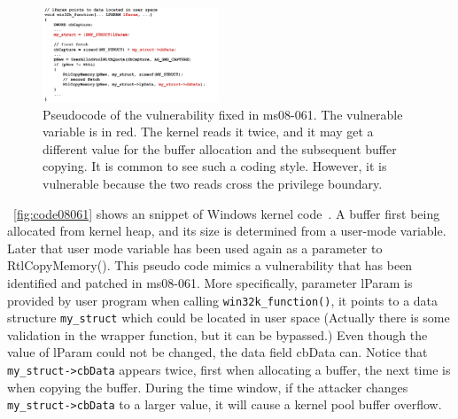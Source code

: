 %
%


\begin{figure}[th]
	\includegraphics[width=0.47\textwidth]{figures/code08061}
	\centering
	\caption{Pseudocode of the vulnerability fixed in ms08-061. The vulnerable variable is in red. The kernel reads it twice, and it may get a different value for the buffer allocation and the subsequent buffer copying. It is common to see such a coding style. However, it is vulnerable because the two reads cross the privilege boundary.}
	\label{fig:code08061}
\end{figure}


~\autoref{fig:code08061} shows an snippet of Windows kernel code~\cite{jurczyk2013identifying}. A buffer first being allocated from kernel heap, and its size is determined from a user-mode variable. Later that user mode variable has been used again as a parameter to RtlCopyMemory(). This pseudo code mimics a vulnerability that has been identified and patched in ms08-061. More specifically, parameter lParam is provided by user program when calling \texttt{win32k\_function()}, it points to a data structure \texttt{my\_struct} which could be located in user space (Actually there is some validation in the wrapper function, but it can be bypassed.) Even though the value of lParam could not be changed, the data field cbData can. Notice that \texttt{my\_struct->cbData} appears twice, first when allocating a buffer, the next time is when copying the buffer. During the time window, if the attacker changes \texttt{my\_struct->cbData} to a larger value, it will cause a kernel pool buffer overflow. 

